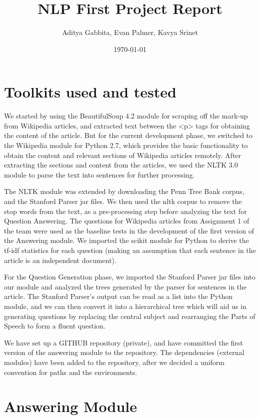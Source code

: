 \documentclass[12pt]{article}
\title{NLP First Project Report}
\date{\today}
\author{Aditya Gabbita, Evan Palmer, Kavya Srinet}
\begin{document}
\maketitle

\section{Toolkits used and tested}

We started by using the BeautifulSoup 4.2 module for scraping off the mark-up from Wikipedia articles, and extracted text between the <p> tags for obtaining the content of the article. But for the current development phase, we switched to the Wikipedia module for Python 2.7, which provides the basic functionality to obtain the content and relevant sections of Wikipedia articles remotely. After extracting the sections and content from the articles, we used the NLTK 3.0 module to parse the text into sentences for further processing.

The NLTK module was extended by downloading the Penn Tree Bank corpus, and the Stanford Parser jar files. We then used the nltk corpus to remove the stop words from the text, as a pre-processing step before analyzing the text for Question Answering. The questions for Wikipedia articles from Assignment 1 of the team were used as the baseline tests in the development of the first version of the Answering module. We imported the scikit module for Python to derive the tf-idf statistics for each question (making an assumption that each sentence in the article is an independent document).

For the Question Generation phase, we imported the Stanford Parser jar files into our module and analyzed the trees generated by the parser for sentences in the article. The Stanford Parser’s output can be read as a list into the Python module, and we can then convert it into a hierarchical tree which will aid us in generating questions by replacing the central subject and rearranging the Parts of Speech to form a fluent question.

We have set up a GITHUB repository (private), and have committed the first version of the answering module to the repository. The dependencies (external modules) have been added to the repository, after we decided a uniform convention for paths and the environments.

\section{Answering Module}
\end{document}
